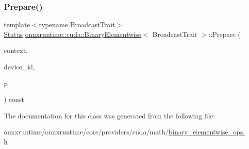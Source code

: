 \mbox{\label{classonnxruntime_1_1cuda_1_1BinaryElementwise_ab910a5bedfd2fe53ef82d618bf76c6bb}} 
\subsubsection{\texorpdfstring{Prepare()}{Prepare()}\hspace{0.1cm}{\footnotesize\ttfamily [3/3]}}
{\footnotesize\ttfamily template$<$typename Broadcast\+Trait$>$ \\
\mbox{\hyperlink{classonnxruntime_1_1common_1_1Status}{Status}} \mbox{\hyperlink{classonnxruntime_1_1cuda_1_1BinaryElementwise}{onnxruntime\+::cuda\+::\+Binary\+Elementwise}}$<$ Broadcast\+Trait $>$\+::Prepare (\begin{DoxyParamCaption}\item[{\mbox{\hyperlink{classonnxruntime_1_1OpKernelContext}{Op\+Kernel\+Context}} $\ast$}]{context,  }\item[{int}]{device\+\_\+id,  }\item[{\mbox{\hyperlink{structonnxruntime_1_1cuda_1_1BinaryElementwisePreparation}{Binary\+Elementwise\+Preparation}} $\ast$}]{p }\end{DoxyParamCaption}) const\hspace{0.3cm}{\ttfamily [protected]}}



The documentation for this class was generated from the following file\+:\begin{DoxyCompactItemize}
\item 
onnxruntime/onnxruntime/core/providers/cuda/math/\mbox{\hyperlink{binary__elementwise__ops_8h}{binary\+\_\+elementwise\+\_\+ops.\+h}}\end{DoxyCompactItemize}
